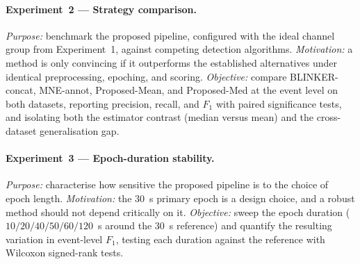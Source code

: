 \paragraph{Experiment~2 --- Strategy comparison.}
\textit{Purpose:} benchmark the proposed pipeline, configured with the ideal channel group
from Experiment~1, against competing detection algorithms.
\textit{Motivation:} a method is only convincing if it outperforms the established
alternatives under identical preprocessing, epoching, and scoring.
\textit{Objective:} compare BLINKER-concat, MNE-annot, Proposed-Mean, and Proposed-Med
at the event level on both datasets, reporting precision, recall, and $F_1$ with paired
significance tests, and isolating both the estimator contrast (median versus mean) and the
cross-dataset generalisation gap.

\paragraph{Experiment~3 --- Epoch-duration stability.}
\textit{Purpose:} characterise how sensitive the proposed pipeline is to the choice of
epoch length.
\textit{Motivation:} the \(30\)~s primary epoch is a design choice, and a robust method
should not depend critically on it.
\textit{Objective:} sweep the epoch duration (\(10/20/40/50/60/120\)~s around the \(30\)~s
reference) and quantify the resulting variation in event-level $F_1$, testing each duration
against the reference with Wilcoxon signed-rank tests.
